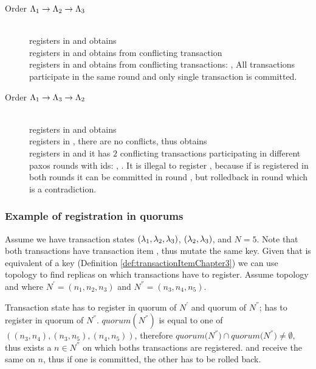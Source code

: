  \begin{description}
 \item[Order $\text{$\Lambda_{1}$} \rightarrow \text{$\Lambda_{2}$} \rightarrow \text{$\Lambda_{3}$}$] \hfill \\
 	 registers in \txIndex and obtains  \\
 	 registers in \txIndex and obtains  from conflicting transaction  \\
 	 registers in \txIndex and obtains  from conflicting transactions: ,  All transactions participate in the same \paxos round and only single transaction is committed. 
 \item[Order $\text{$\Lambda_{1}$} \rightarrow \text{$\Lambda_{3}$} \rightarrow \text{$\Lambda_{2}$}$] \hfill \\
 	 registers in \txIndex and obtains  \\
 	 registers in \txIndex, there are no conflicts, thus obtains \\
 	 registers in \txIndex and it has $2$ conflicting transactions participating in different paxos rounds with ids: , . It is illegal to register , because if  is registered in both rounds it can be committed in round , but rolledback in round  which is a contradiction.

 \end{description}

\subsubsection{Example of registration in quorums}
Assume we have transaction states
$(\text{$\lambda_{1}$},\text{$\lambda_{2}$}, \text{$\lambda_{3}$})$,
$(\text{$\lambda_{2}$},\text{$\lambda_{3}$})$,  and $N=5$. Note that both transactions have transaction item , thus mutate the same key. Given that \txItem is equivalent of a key (Definition \ref{def:transactionItemChapter3}) we can use topology \topology to find replicas on which transactions have to register. Assume topology  and  where $N^'=(n_1, n_2, n_3)$ and $N^{''}=(n_3,n_4,n_5)$.

Transaction state  has to register in quorum of $N^'$ and quorum of $N^{''}$;  has to register in quorum of $N^{''}$.
$quorum(N^{''})$ is equal to one of $((n_3,n_4),(n_3,n_5),(n_4,n_5))$, therefore $\mathit{quorum(N^{''}}) \cap \mathit{quorum(N^{''}}) \neq \emptyset$, thus exists a $n\in N^{''}$ on which boths transactions are registered.
 and  receive the same \paxosRoundId on $n$, thus if one is committed, the other has to be rolled back.

